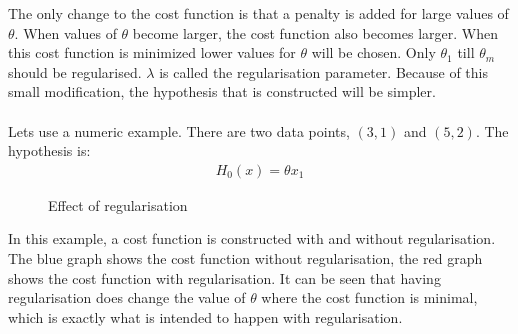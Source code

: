 The only change to the cost function is that a penalty is added for large values of $\theta$. When values of $\theta$ become larger, the cost function also becomes larger. When this cost function is minimized lower values for $\theta$ will be chosen. Only $\theta_1$ till $\theta_m$ should be regularised. $\lambda$ is called the regularisation parameter. Because of this small modification, the hypothesis that is constructed will be simpler.
\\\\
Lets use a numeric example. There are two data points, $(3,1)$ and $(5,2)$. The hypothesis is:
\begin{align}
H_0(x) = \theta x_1
\end{align}
\begin{figure}[H]
\centering
{}
\caption{Effect of regularisation} \label{fig:regularisation}
\end{figure}
\noindent In this example, a cost function is constructed with and without regularisation. The blue graph shows the cost function without regularisation, the red graph shows the cost function with regularisation. It can be seen that having regularisation does change the value of $\theta$ where the cost function is minimal, which is exactly what is intended to happen with regularisation. 


